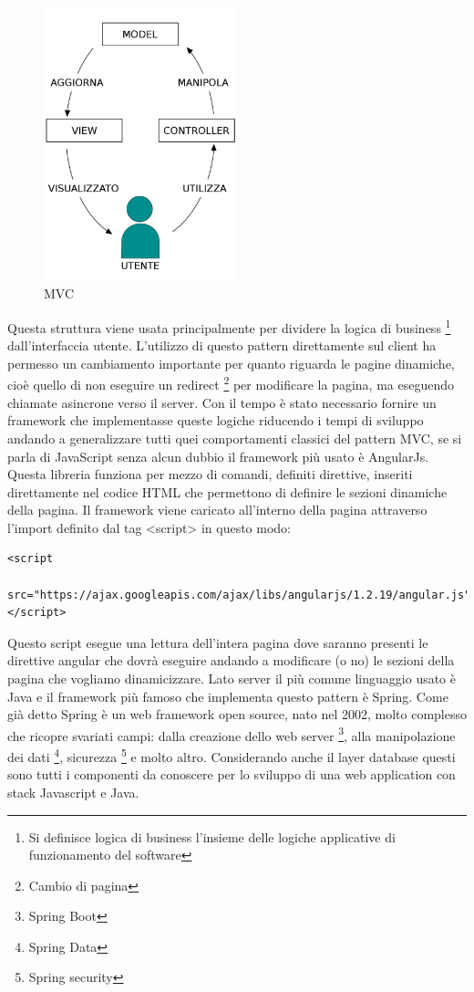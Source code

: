 \begin{figure}[H]
 \centering
  \includegraphics[width=0.5\textwidth]{img/MVC-Process.png}
 \caption{MVC}
 \end{figure}
Questa struttura viene usata principalmente per dividere la logica di business \footnote{Si definisce logica di business l'insieme delle logiche applicative di funzionamento del software} dall'interfaccia utente.
L'utilizzo di questo pattern direttamente sul client ha permesso un cambiamento importante per quanto riguarda le pagine dinamiche, cioè quello di non eseguire un redirect \footnote{Cambio di pagina} per modificare la pagina, ma eseguendo chiamate asincrone verso il server. 
Con il tempo è stato necessario fornire un framework che implementasse queste logiche riducendo i tempi di sviluppo andando a generalizzare tutti quei comportamenti classici del pattern MVC, se si parla di JavaScript senza alcun dubbio il framework più usato è AngularJs. 
Questa libreria funziona per mezzo di comandi, definiti direttive, inseriti direttamente nel codice HTML che permettono di definire le sezioni dinamiche della pagina. Il framework viene caricato all'interno della pagina attraverso l'import definito dal tag <script> in questo modo:
\begin{lstlisting}
<script
 src="https://ajax.googleapis.com/ajax/libs/angularjs/1.2.19/angular.js">
</script>
\end{lstlisting}
Questo script esegue una lettura dell'intera pagina dove saranno presenti le direttive angular che dovrà eseguire andando a modificare (o no) le sezioni della pagina che vogliamo dinamicizzare.
Lato server il più comune linguaggio usato è Java e il framework più famoso che implementa questo pattern è Spring. Come già detto Spring è un web framework open source, nato nel 2002, molto complesso che ricopre svariati campi: dalla creazione dello web server \footnote{Spring Boot}, alla manipolazione dei dati \footnote{Spring Data}, sicurezza \footnote{Spring security} e molto altro.
Considerando anche il layer database questi sono tutti i componenti da conoscere per lo sviluppo di una web application con stack Javascript e Java. 

